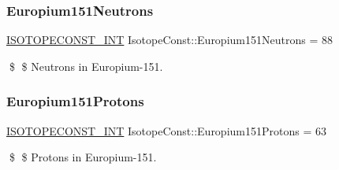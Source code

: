 \subsubsection{\texorpdfstring{Europium151\+Neutrons}{Europium151Neutrons}}
{\footnotesize\ttfamily \mbox{\hyperlink{group___isotope_const-_macros_ga5f18360b3e99483a35c32d789e62621c}{I\+S\+O\+T\+O\+P\+E\+C\+O\+N\+S\+T\+\_\+\+I\+NT}} Isotope\+Const\+::\+Europium151\+Neutrons = 88}

\$ \$ Neutrons in Europium-\/151. \mbox{\label{group___isotope_const-_europium-_eu151_ga6f0c78136fbdb60cc04045176f714f01}} 
\subsubsection{\texorpdfstring{Europium151\+Protons}{Europium151Protons}}
{\footnotesize\ttfamily \mbox{\hyperlink{group___isotope_const-_macros_ga5f18360b3e99483a35c32d789e62621c}{I\+S\+O\+T\+O\+P\+E\+C\+O\+N\+S\+T\+\_\+\+I\+NT}} Isotope\+Const\+::\+Europium151\+Protons = 63}

\$ \$ Protons in Europium-\/151. 